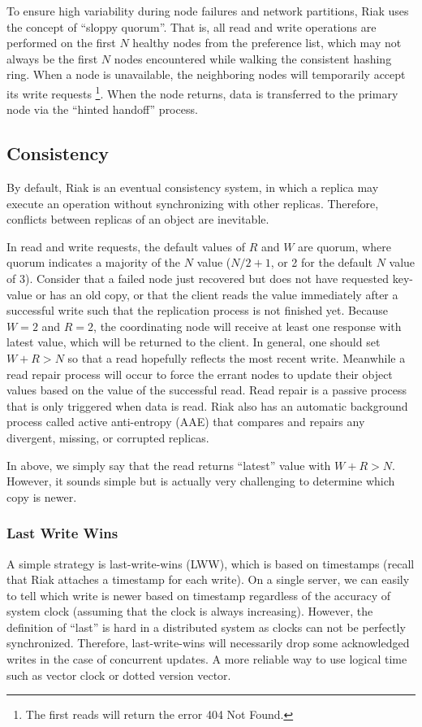 \documentclass[12pt]{book}
\begin{document}
To ensure high variability during node failures and network partitions, Riak uses the concept of ``sloppy quorum''. That is, all read and write operations are performed on the first $N$ healthy nodes from the preference list, which may not always be the first $N$ nodes encountered while walking the consistent hashing ring.
When a node is unavailable, the neighboring nodes will temporarily accept its write requests \footnote{The first reads will return the error 404 Not Found.}. When the node returns, data is transferred to the primary node via the ``hinted handoff'' process.

\subsection{Consistency}
By default, Riak is an eventual consistency system, in which a replica may execute an operation without synchronizing with other replicas. Therefore, conflicts between replicas of an object are inevitable.

In read and write requests, the default values of $R$ and $W$ are quorum, where quorum indicates a majority of the $N$ value ($N/2+1$, or 2 for the default $N$ value of 3). Consider that a failed node just recovered but does not have requested key-value or has an old copy, or that the client reads the value immediately after a successful write such that the replication process is not finished yet. Because $W=2$ and $R=2$, the coordinating node will receive at least one response with latest value, which will be returned to the client. In general, one should set $W+R>N$ so that a read hopefully reflects the most recent write.
Meanwhile a read repair process will occur to force the errant nodes to update their object values based on the value of the successful read. 
Read repair is a passive process that is only triggered when data is read. Riak also has an automatic background process called active anti-entropy (AAE) that compares and repairs any divergent, missing, or corrupted replicas.

In above, we simply say that the read returns ``latest'' value with $W+R>N$. However, it sounds simple but is actually very challenging to determine which copy is newer.

\subsubsection{Last Write Wins}
A simple strategy is last-write-wins (LWW), which is based on timestamps (recall that Riak attaches a timestamp for each write). On a single server, we can easily to tell which write is newer based on timestamp regardless of the accuracy of system clock (assuming that the clock is always increasing). However, the definition of ``last'' is hard in a distributed system as clocks can not be perfectly synchronized.
Therefore, last-write-wins will necessarily drop some acknowledged writes in the case of concurrent updates. A more reliable way to use logical time such as vector clock or dotted version vector.
\end{document}

